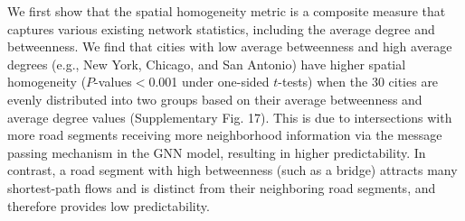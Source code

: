 \documentclass[10pt]{wlscirep}
\begin{document}
We first show that the spatial homogeneity metric is a composite measure that captures various existing network statistics, including the average degree and betweenness. We find that cities with low average betweenness and high average degrees (e.g., New York, Chicago, and San Antonio) have higher spatial homogeneity ($P$-values$<$0.001 under one-sided $t$-tests) when the 30 cities are evenly distributed into two groups based on their average betweenness and average degree values (Supplementary Fig. 17). This is due to intersections with more road segments receiving more neighborhood information via the message passing mechanism in the GNN model, resulting in higher predictability. In contrast, a road segment with high betweenness (such as a bridge) attracts many shortest-path flows and is distinct from their neighboring road segments, and therefore provides low predictability.
\end{document}

